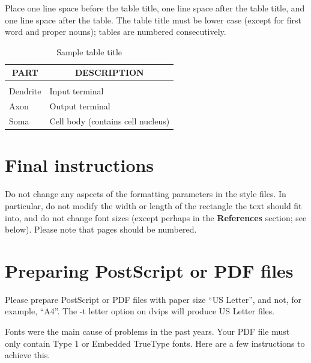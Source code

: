 \documentclass{article} %
\begin{document}
Place one line space before the table title, one line space after the table
title, and one line space after the table. The table title must be lower case
(except for first word and proper nouns); tables are numbered consecutively.

\begin{table}[t]
\caption{Sample table title}
\label{sample-table}
\begin{center}
\begin{tabular}{ll}
\multicolumn{1}{c}{\bf PART}  &\multicolumn{1}{c}{\bf DESCRIPTION}
\\ \hline \\
Dendrite         &Input terminal \\
Axon             &Output terminal \\
Soma             &Cell body (contains cell nucleus) \\
\end{tabular}
\end{center}
\end{table}

\section{Final instructions}

Do not change any aspects of the formatting parameters in the style files.
In particular, do not modify the width or length of the rectangle the text
should fit into, and do not change font sizes (except perhaps in the
\textbf{References} section; see below). Please note that pages should be
numbered.

\section{Preparing PostScript or PDF files}

Please prepare PostScript or PDF files with paper size ``US Letter'', and
not, for example, ``A4''. The -t
letter option on dvips will produce US Letter files.

Fonts were the main cause of problems in the past years. Your PDF file must
only contain Type 1 or Embedded TrueType fonts. Here are a few instructions
to achieve this.
\end{document}
